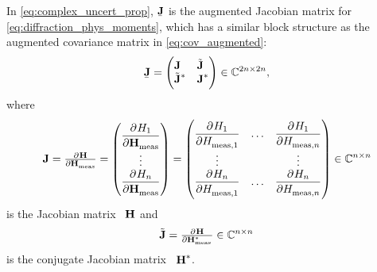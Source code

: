 In \cref{eq:complex_uncert_prop}, $\underaccent{\bar}{\mat{J}}$ is the
augmented Jacobian matrix for \cref{eq:diffraction_phys_moments}, which
has a similar block structure as the augmented covariance matrix in
\cref{eq:cov_augmented}:
\begin{equation}
  \label{eq:J_augmented}
  \underaccent{\bar}{\mat{J}}
  = \begin{pmatrix*}[l]
    \mat{J} & \tilde{\mat{J}} \\
    \tilde{\mat{J}}^* & \mat{J}^*
  \end{pmatrix*}
  \in \mathbb{C}^{2n \times 2n},
\end{equation}
where
\begin{equation}
  \mat{J}
  = \pd{\vect{H}}{\vect{H}_\text{meas}}
  = \begin{pmatrix}
    \dpd{H_1}{\vect{H}_\text{meas}} \\
    \vdots \\
    \dpd{H_n}{\vect{H}_\text{meas}}
  \end{pmatrix}
  = \begin{pmatrix}
    \dpd{H_1}{H_{\text{meas}, 1}} & \ldots & \dpd{H_1}{H_{\text{meas}, n}} \\
    \vdots & & \vdots \\
    \dpd{H_n}{H_{\text{meas}, 1}} & \ldots & \dpd{H_n}{H_{\text{meas}, n}}
  \end{pmatrix}
  \in \mathbb{C}^{n \times n}
\end{equation}
is the Jacobian matrix \wrt~$\bm{\mathrm{H}}$ and
\begin{equation}
  \tilde{\mat{J}}
  = \pd{\vect{H}}{{\vect{H}_\text{meas}^*}}
  \in \mathbb{C}^{n \times n}
\end{equation}
is the conjugate Jacobian matrix \wrt~$\bm{\mathrm{H}}^*$.

